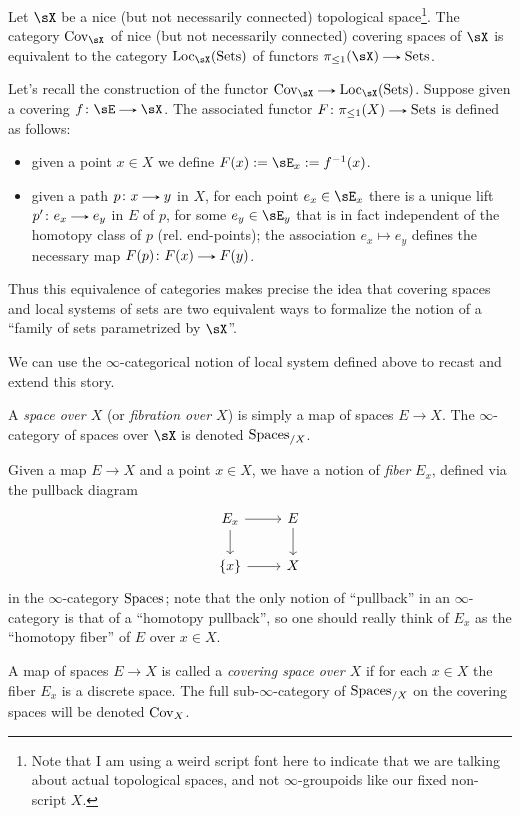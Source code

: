 \begin{theorem}
  \label{fib-covering-traditionial}
  Let $\sX$ be a nice (but not necessarily connected) topological space\footnote{Note that I am using a weird script font here to indicate that we are talking about actual topological spaces, and not $\infty$-groupoids like our fixed non-script $X$.}. The category $\Cov_\sX$ of nice (but not necessarily connected) covering spaces of $\sX$ is equivalent to the category $\Loc_\sX(\Sets)$ of functors $\pi_{\le 1}(\sX) \to \Sets$.

  \begin{subremark}
    \label{fib-covering-traditional-explained}
    Let's recall the construction of the functor $\Cov_\sX \to \Loc_\sX(\Sets)$. Suppose given a covering $f \c \sE \to \sX$. The associated functor $F \c \pi_{\le 1}(X) \to \Sets$ is defined as follows:
    \begin{itemize}
    \item given a point $x \in X$ we define $F(x) \ce \sE_x \ce f^{-1}(x)$.
    \item given a path $p \c x \to y$ in $X$, for each point $e_x \in \sE_x$ there is a unique lift $p' \c e_x \to e_y$ in $E$ of $p$, for some $e_y \in \sE_y$ that is in fact independent of the homotopy class of $p$ (rel. end-points); the association $e_x \mapsto e_y$ defines the necessary map $F(p) \c F(x) \to F(y)$.
    \end{itemize}

    Thus this equivalence of categories makes precise the idea that covering spaces and local systems of sets are two equivalent ways to formalize the notion of a ``family of sets parametrized by $\sX$''.
  \end{subremark}
\end{theorem}

We can use the $\infty$-categorical notion of local system defined above to recast and extend this story.

\begin{definition}
  \label{fib-over}
  A \emph{space over $X$} (or \emph{fibration over $X$}) is simply a map of spaces $E \to X$. The $\infty$-category of spaces over $\sX$ is denoted $\mathrm{Spaces}_{/X}$.

  Given a map $E \to X$ and a point $x \in X$, we have a notion of \emph{fiber} $E_x$, defined via the pullback diagram
  \[
    \begin{tikzcd}
      E_x \ar[r] \ar[d] &
      E \ar[d] \\
      \{x\} \ar[r] &
      X
    \end{tikzcd}
  \]
  in the $\infty$-category $\mathrm{Spaces}$; note that the only notion of ``pullback'' in an $\infty$-category is that of a ``homotopy pullback'', so one should really think of $E_x$ as the ``homotopy fiber'' of $E$ over $x \in X$.
  
  A map of spaces $E \to X$ is called a \emph{covering space over $X$} if for each $x \in X$ the fiber $E_x$ is a discrete space. The full sub-$\infty$-category of $\mathrm{Spaces}_{/X}$ on the covering spaces will be denoted $\operatorname{Cov}_X$.
\end{definition}

